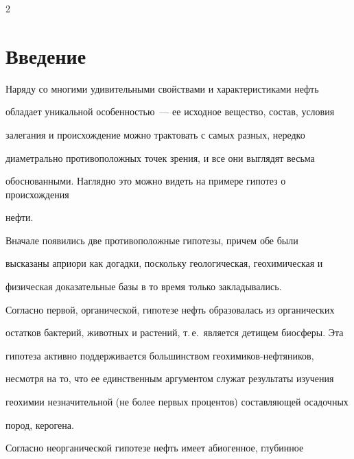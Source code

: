 


      \thispagestyle{headings}



      \begin{multicols}{2}



      \label{st\stat}

     

     \section{Введение}

     

     Наряду со многими удивительными свойствами и характеристиками нефть 

обладает уникальной особенностью~--- ее исходное вещество, состав, условия 

залегания и происхождение можно трактовать с самых разных, нередко 

диаметрально противоположных точек зрения, и все они выглядят весьма 

обоснованными. Наглядно это можно видеть на примере гипотез о происхождения 

нефти.

     

     Вначале появились две противоположные гипотезы, причем обе были 

высказаны априори как догадки, поскольку геологическая, геохимическая и 

физическая доказательные базы в то время только закладывались. 

     

     Согласно первой, органической, гипотезе нефть образовалась из органических 

остатков бактерий, животных и растений, т.\,е.\ является детищем биосферы. Эта 

гипотеза активно поддерживается большинством геохимиков-нефтяников, 

несмотря на то, что ее единственным аргументом служат результаты изучения 

геохимии незначительной (не более первых процентов) составляющей осадочных 

пород, керогена. 

     

     Согласно неорганической гипотезе нефть имеет абиогенное, глубинное 


\end{multicols}
